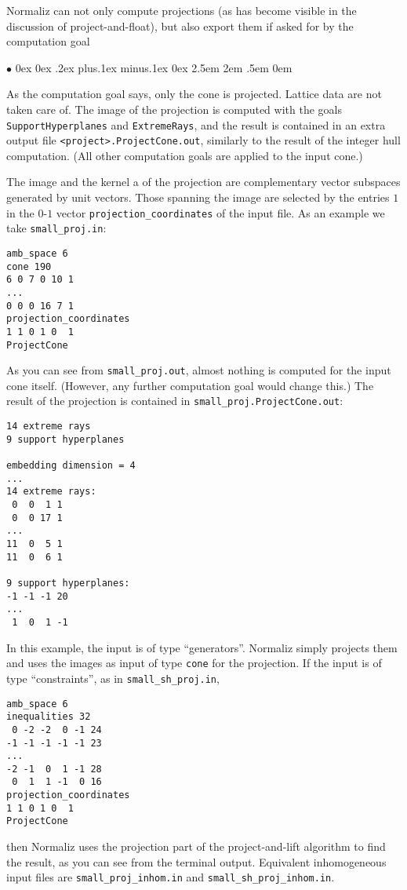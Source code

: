 \documentclass[12pt,a4paper]{scrartcl}
\newcommand{\stdli}{ \topsep0ex \partopsep0ex %
\parsep.2ex plus.1ex minus.1ex \itemsep0ex%
\leftmargin2.5em \labelwidth2em \labelsep.5em \rightmargin0em}%
\renewenvironment{itemize}{\begin{list}{{$\bullet$}}{\stdli}}{\end{list}}
\theoremstyle{definition}
\def\itemtt[#1]{\item[\textbf{\ttt{#1}}]}
\def\ttt{\texttt}
\begin{document}
Normaliz can not only compute projections (as has become visible in the discussion of project-and-float), but also export them if asked for by the computation goal
\begin{itemize}
	\itemtt[ProjectCone]
\end{itemize}
As the computation goal says, only the cone is projected. Lattice data are not taken care of. The image of the projection is computed with the goals \verb|SupportHyperplanes| and \verb|ExtremeRays|, and the result is contained in an extra output file \verb|<project>.ProjectCone.out|, similarly to the result of the integer hull computation. (All other computation goals are applied to the input cone.)

The image and the kernel a of the projection are complementary vector subspaces generated by unit vectors. Those spanning the image are selected by the entries $1$ in the $0$-$1$ vector \verb|projection_coordinates| of the input file. As an example we take
\verb|small_proj.in|:
\begin{Verbatim}
amb_space 6
cone 190
6 0 7 0 10 1
...
0 0 0 16 7 1
projection_coordinates
1 1 0 1 0  1
ProjectCone
\end{Verbatim}
As you can see from \verb|small_proj.out|, almost nothing is computed for the input cone itself. (However, any further computation goal would change this.) The result of the projection is contained in \verb|small_proj.ProjectCone.out|:
\begin{Verbatim}
14 extreme rays
9 support hyperplanes

embedding dimension = 4
...
14 extreme rays:
 0  0  1 1
 0  0 17 1
...
11  0  5 1
11  0  6 1

9 support hyperplanes:
-1 -1 -1 20
...
 1  0  1 -1
\end{Verbatim}
In this example, the input is of type ``generators''. Normaliz simply projects them and uses the images as input of type \verb|cone| for the projection. If the input is of type ``constraints'', as in \verb|small_sh_proj.in|,
\begin{Verbatim}
amb_space 6
inequalities 32
 0 -2 -2  0 -1 24
-1 -1 -1 -1 -1 23
...
-2 -1  0  1 -1 28
 0  1  1 -1  0 16
projection_coordinates
1 1 0 1 0  1
ProjectCone
\end{Verbatim}
then Normaliz uses the projection part of the project-and-lift algorithm to find the result, as you can see from the terminal output. Equivalent inhomogeneous input files are \verb|small_proj_inhom.in| and \verb|small_sh_proj_inhom.in|.
\end{document}
